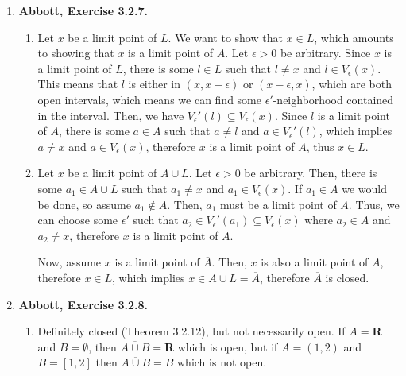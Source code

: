 \documentclass{article}
\newcommand{\N}{\mathbf{N}}
\newcommand{\R}{\mathbf{R}}
\newcommand{\set}[1]{\{#1\}}
\newcommand{\exc}[2][Abbott]{\item \textbf{#1, Exercise #2.}}
\newcommand{\lep}[1][L]{#1et $\epsilon > 0$ be arbitrary}
\begin{document}
\begin{enumerate}
\begin{enumerate}
        \item Define $A := \set{\sqrt{2} + 1/k : k \in \N} \cup \sqrt{2}$. The only limit point of $A$ is $\sqrt{2}$, so $A$ is closed, bounded and infinite but contains no rational numbers.
        
        \item The Cantor set is an intersection of closed sets, so it must be closed, by Theorem 3.2.14.
    \end{enumerate}
    
    \exc{3.2.7}
    \begin{enumerate}
        \item Let $x$ be a limit point of $L$. We want to show that $x \in L$, which amounts to showing that $x$ is a limit point of $A$. \lep. Since $x$ is a limit point of $L$, there is some $l \in L$ such that $l \neq x$ and $l \in V_\epsilon(x)$. This means that $l$ is either in $(x, x+\epsilon)$ or $(x-\epsilon, x)$, which are both open intervals, which means we can find some $\epsilon'$-neighborhood contained in the interval. Then, we have $V_\epsilon'(l) \subseteq V_\epsilon(x)$. Since $l$ is a limit point of $A$, there is some $a \in A$ such that $a \neq l$ and $a \in V_\epsilon'(l)$, which implies $a \neq x$ and $a \in V_\epsilon(x)$, therefore $x$ is a limit point of $A$, thus $x \in L$.
        
        \item Let $x$ be a limit point of $A \cup L$. \lep. Then, there is some $a_1 \in A \cup L$ such that $a_1 \neq x$ and $a_1 \in V_\epsilon(x)$. If $a_1 \in A$ we would be done, so assume $a_1 \notin A$. Then, $a_1$ must be a limit point of $A$. Thus, we can choose some $\epsilon'$ such that $a_2 \in V_\epsilon'(a_1) \subseteq V_\epsilon(x)$ where $a_2 \in A$ and $a_2 \neq x$, therefore $x$ is a limit point of $A$.
        
        Now, assume $x$ is a limit point of  $\overline{A}$. Then, $x$ is also a limit point of $A$, therefore $x \in L$, which implies $x \in A \cup L = \overline{A}$, therefore $\overline{A}$ is closed.
    \end{enumerate}
    
    \exc{3.2.8}
    \begin{enumerate}
        \item Definitely closed (Theorem 3.2.12), but not necessarily open. If $A = \R$ and $B = \emptyset$, then $\overline{A \cup B} = \R$ which is open, but if $A = (1, 2)$ and $B = [1,2]$ then $\overline{A \cup B} = B$ which is not open.
        

\end{enumerate}
\end{enumerate}
\end{document}
